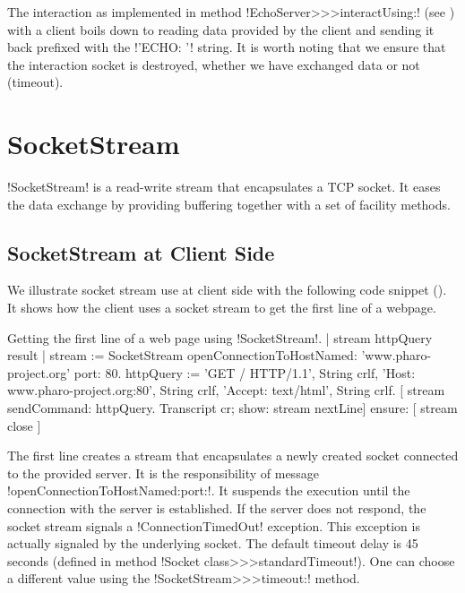 \documentclass[a4paper,10pt,twoside]{book}
\begin{document}
The interaction as implemented in method \ct!EchoServer>>>interactUsing:! (see ) with a client boils down to reading data provided by the client and sending it back prefixed with the \ct!'ECHO: '! string.
It is worth noting that we ensure that the interaction socket is destroyed, whether we have exchanged data or not (timeout).

\section{SocketStream} 
\label{sec:socketStream}
\ct!SocketStream! is a read-write stream that encapsulates a TCP socket.
It eases the data exchange by providing buffering together with a set of facility methods.


\subsection{SocketStream at Client Side}
We illustrate socket stream use at client side with the following code snippet ().
It shows how the client uses a socket stream to get the first line of a webpage.

\begin{script}{Getting the first line of a web page using \ct!SocketStream!.}
	| stream httpQuery result |
	stream := SocketStream 
			openConnectionToHostNamed: 'www.pharo-project.org' 
			port: 80.
	httpQuery := 'GET / HTTP/1.1', String crlf, 
		'Host: www.pharo-project.org:80', String crlf, 
		'Accept: text/html', String crlf.
	[ stream sendCommand: httpQuery.
	Transcript cr; show: stream nextLine] ensure: [ stream close ]
\end{script}

The first line creates a stream that encapsulates a newly created socket connected to the provided server.
It is the responsibility of message \ct!openConnectionToHostNamed:port:!.
It suspends the execution until the connection with the server is established.
If the server does not respond, the socket stream signals a \ct!ConnectionTimedOut! exception.
This exception is actually signaled by the underlying socket.
The default timeout delay is 45 seconds (defined in method \ct!Socket class>>>standardTimeout!).
One can choose a different value using the \ct!SocketStream>>>timeout:! method.
\end{document}
